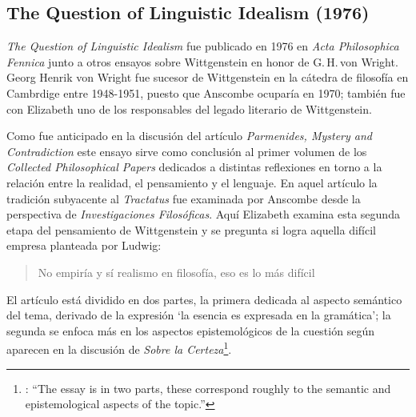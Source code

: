 \subsection{The Question of Linguistic Idealism (1976)}

\emph{The Question of Linguistic Idealism} fue publicado en 1976 en \emph{Acta Philosophica Fennica} junto a otros ensayos sobre Wittgenstein en honor de G.\,H.\,von Wright. Georg Henrik von Wright fue sucesor de Wittgenstein en la cátedra de filosofía en Cambrdige entre 1948-1951, puesto que Anscombe ocuparía en 1970; también fue con Elizabeth uno de los responsables del legado literario de Wittgenstein.

Como fue anticipado en la discusión del artículo \emph{Parmenides, Mystery and Contradiction} este ensayo sirve como conclusión al primer volumen de los \emph{Collected Philosophical Papers} dedicados a distintas reflexiones en torno a la relación entre la realidad, el pensamiento y el lenguaje. En aquel artículo la tradición subyacente al \emph{Tractatus} fue examinada por Anscombe desde la perspectiva de \emph{Investigaciones Filosóficas}. Aquí Elizabeth examina esta segunda etapa del pensamiento de Wittgenstein y se pregunta si logra aquella difícil empresa planteada por Ludwig: \blockquote[{\cite[VI, 23]{wittgenstein1956remmathes}}
]{No empiría y sí realismo en filosofía, eso es lo más difícil}.
El artículo está dividido en dos partes, la primera dedicada al aspecto semántico del tema, derivado de la expresión \enquote*{la esencia es expresada en la gramática}; la segunda se enfoca más en los aspectos epistemológicos de la cuestión según aparecen en la discusión de \emph{Sobre la Certeza}\footnote{\cite[Cf.~][215]{teichmann2008ans}: \enquote{The essay is in two parts, these correspond roughly to the semantic and epistemological aspects of the topic.}}.


